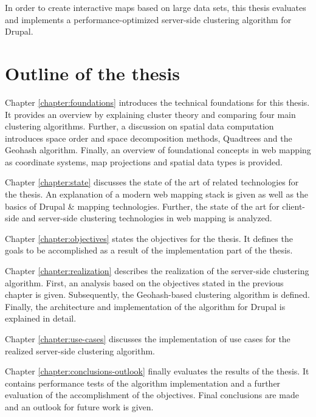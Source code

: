 In order to create interactive maps based on large data sets, this thesis evaluates and implements a performance-optimized server-side clustering algorithm for Drupal.


\section{Outline of the thesis}

Chapter \ref{chapter:foundations} introduces the technical foundations for this thesis. It provides an overview by explaining cluster theory and comparing four main clustering algorithms. Further, a discussion on spatial data computation introduces space order and space decomposition methods, Quadtrees and the Geohash algorithm. Finally, an overview of foundational concepts in web mapping as coordinate systems, map projections and spatial data types is provided. 

Chapter \ref{chapter:state} discusses the state of the art of related technologies for the thesis. An explanation of a modern web mapping stack is given as well as the basics of Drupal \& mapping technologies. Further, the state of the art for client-side and server-side clustering technologies in web mapping is analyzed.

Chapter \ref{chapter:objectives} states the objectives for the thesis. It defines the goals to be accomplished as a result of the implementation part of the thesis.

Chapter \ref{chapter:realization} describes the realization of the server-side clustering algorithm. First, an analysis based on the objectives stated in the previous chapter is given. Subsequently, the Geohash-based clustering algorithm is defined. Finally, the architecture and implementation of the algorithm for Drupal is explained in detail.

Chapter \ref{chapter:use-cases} discusses the implementation of use cases for the realized server-side clustering algorithm.

Chapter \ref{chapter:conclusions-outlook} finally evaluates the results of the thesis. It contains performance tests of the algorithm implementation and a further evaluation of the accomplishment of the objectives. Final conclusions are made and an outlook for future work is given.